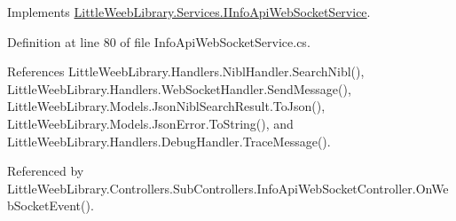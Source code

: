 Implements \mbox{\hyperlink{interface_little_weeb_library_1_1_services_1_1_i_info_api_web_socket_service_ae8d7dda1099fcb5af57dc702da33024b}{Little\+Weeb\+Library.\+Services.\+I\+Info\+Api\+Web\+Socket\+Service}}.



Definition at line 80 of file Info\+Api\+Web\+Socket\+Service.\+cs.



References Little\+Weeb\+Library.\+Handlers.\+Nibl\+Handler.\+Search\+Nibl(), Little\+Weeb\+Library.\+Handlers.\+Web\+Socket\+Handler.\+Send\+Message(), Little\+Weeb\+Library.\+Models.\+Json\+Nibl\+Search\+Result.\+To\+Json(), Little\+Weeb\+Library.\+Models.\+Json\+Error.\+To\+String(), and Little\+Weeb\+Library.\+Handlers.\+Debug\+Handler.\+Trace\+Message().



Referenced by Little\+Weeb\+Library.\+Controllers.\+Sub\+Controllers.\+Info\+Api\+Web\+Socket\+Controller.\+On\+Web\+Socket\+Event().


